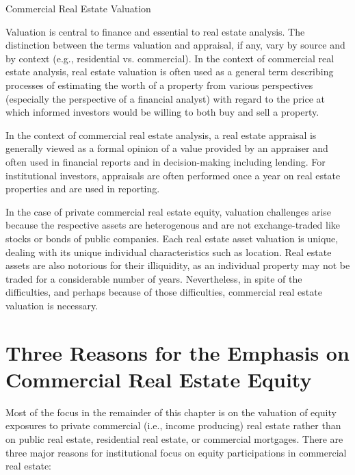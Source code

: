 \documentclass[11pt]{article}
\begin{document}
Commercial Real Estate Valuation

Valuation is central to finance and essential to real estate analysis. The distinction between the terms valuation and appraisal, if any, vary by source and by context (e.g., residential vs. commercial). In the context of commercial real estate analysis, real estate valuation is often used as a general term describing processes of estimating the worth of a property from various perspectives (especially the perspective of a financial analyst) with regard to the price at which informed investors would be willing to both buy and sell a property.

In the context of commercial real estate analysis, a real estate appraisal is generally viewed as a formal opinion of a value provided by an appraiser and often used in financial reports and in decision-making including lending. For institutional investors, appraisals are often performed once a year on real estate properties and are used in reporting.

In the case of private commercial real estate equity, valuation challenges arise because the respective assets are heterogenous and are not exchange-traded like stocks or bonds of public companies. Each real estate asset valuation is unique, dealing with its unique individual characteristics such as location. Real estate assets are also notorious for their illiquidity, as an individual property may not be traded for a considerable number of years. Nevertheless, in spite of the difficulties, and perhaps because of those difficulties, commercial real estate valuation is necessary.

\section*{Three Reasons for the Emphasis on Commercial Real Estate Equity}
Most of the focus in the remainder of this chapter is on the valuation of equity exposures to private commercial (i.e., income producing) real estate rather than on public real estate, residential real estate, or commercial mortgages. There are three major reasons for institutional focus on equity participations in commercial real estate:
\end{document}
